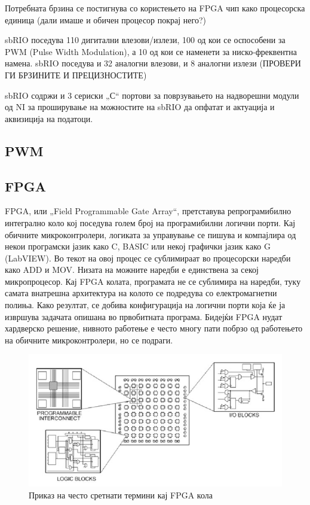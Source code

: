 \documentclass{article}
\begin{document}
Потребната брзина се постигнува со користењето на FPGA чип како процесорска единица (дали имаше и обичен процесор покрај него?)

sbRIO поседува 110 дигитални влезови/излези, 100 од кои се оспособени за PWM (Pulse Width Modulation), а 10 од кои се наменети за ниско-фреквентна намена. sbRIO поседува и 32 аналогни влезови, и 8 аналогни излези (ПРОВЕРИ ГИ БРЗИНИТЕ И ПРЕЦИЗНОСТИТЕ)

sbRIO содржи и 3 сериски „С“ портови за поврзувањето на надворешни модули од NI за проширување на можностите на sbRIO да опфатат и актуација и аквизиција на податоци.
\subsection{PWM}

\subsection{FPGA}
FPGA, или „Field Programmable Gate Array“, претставува репрограмибилно интегрално коло кој поседува голем број на програмибилни логични порти. Кај обичните микроконтролери, логиката за управување се пишува и компајлира од некои програмски јазик како C, BASIC или некој графички јазик како G (LabVIEW). Во текот на овој процес се сублимираат во процесорски наредби како ADD и MOV. Низата на можните наредби е единствена за секој микропроцесор. Кај FPGA колата, програмата не се сублимира на наредби, туку самата внатрешна архитектура на колото се подредува со електромагнетни полиња. Како резултат, се добива конфигурација на логични порти која ќе ја извршува задачата опишана во првобитната програма. Бидејќи FPGA нудат хардверско решение, нивното работење е често многу пати побрзо од работењето на обичните микроконтролери, но се подраги.  

\begin{figure}[h]
\includegraphics[width=0.75\linewidth]{fpga_diagram.jpg}
\centering
\caption{Приказ на често сретнати термини кај FPGA кола}
\label{fig:fpga_diagram_jpg}
\end{figure}
\end{document}
